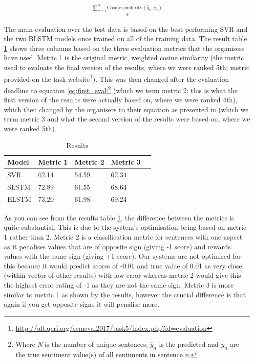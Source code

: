 \documentclass[11pt,a4paper]{article}
\begin{document}
\begin{equation}
\label{eq:first_eval}
\begin{gathered}
\frac{\sum_{n=1}^{N} \text{Cosine similarity}(\hat y_n, y_n)}{N}
\end{gathered}
\end{equation}

The main evaluation over the test data is based on the best performing SVR and the two BLSTM models once trained on all of the training data. The result table \ref{tab:results} shows three columns based on the three evaluation metrics that the organisers have used. Metric 1 is the original metric, weighted cosine similarity (the metric used to evaluate the final version of the results, where we were ranked 5th; metric provided on the task website\footnote{\url{http://alt.qcri.org/semeval2017/task5/index.php?id=evaluation}}). This was then changed after the evaluation deadline to equation \ref{eq:first_eval}\footnote{Where \textit{N} is the number of unique sentences, $\hat{y}_n$ is the predicted and $y_n$ are the true sentiment value(s) of all sentiments in sentence $n$.} (which we term metric 2; this is what the first version of the results were actually based on, where we were ranked 4th), which then changed by the organisers to their equation as presented in \citet{semeval20175} (which we term metric 3 and what the second version of the results were based on, where we were ranked 5th).

\begin{table}[h]
\centering
\begin{tabular}{|l|l|l|l|l}
\hline
 Model&  Metric 1&  Metric 2& Metric 3\\
 \hline
 SVR&  62.14&  54.59&  62.34 \\
 SLSTM&  72.89&  61.55&  68.64 \\
 ELSTM&  73.20&  61.98&  69.24 \\
 \hline
\end{tabular}
\caption{Results}
\label{tab:results}
\end{table}
As you can see from the results table \ref{tab:results}, the difference between the metrics is quite substantial. This is due to the system's optimisation being based on metric 1 rather than 2. Metric 2 is a classification metric for sentences with one aspect as it penalises values that are of opposite sign (giving -1 score) and rewards values with the same sign (giving +1 score). Our systems are not optimised for this because it would predict scores of -0.01 and true value of 0.01 as very close (within vector of other results) with low error whereas metric 2 would give this the highest error rating of -1 as they are not the same sign. Metric 3 is more similar to metric 1 as shown by the results, however the crucial difference is that again if you get opposite signs it will penalise more.   %
\end{document}
